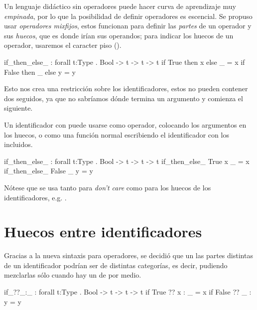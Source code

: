 {\begin{designfr}
Un lenguaje didáctico sin operadores puede hacer curva de aprendizaje muy \emph{empinada}, por lo que la posibilidad de definir operadores es escencial. Se propuso usar \emph{operadores mixfijos}, estos funcionan para definir las \emph{partes} de un operador y sus \emph{huecos}, que es donde irían sus operandos; para indicar los huecos de un operador, usaremos el caracter piso (\inlinecode{\_}).

\begin{anglercode}
if_then_else_ : forall t:Type . Bool -> t -> t -> t
if True  then x else _ = x
if False then _ else y = y
\end{anglercode}

Esto nos crea una restricción sobre los identificadores, estos no pueden contener dos \inlinecode{\_} seguidos, ya que no sabríamos dónde termina un argumento y comienza el siguiente.

Un identificador con \inlinecode{\_} puede usarse como operador, colocando los argumentos en los huecos, o como una función normal escribiendo el identificador con los \inlinecode{\_} incluidos.

\begin{anglercode}
if_then_else_ : forall t:Type . Bool -> t -> t -> t
if_then_else_ True  x _ = x
if_then_else_ False _ y = y
\end{anglercode}

Nótese que se usa \inlinecode{\_} tanto para \emph{don't care} como para los huecos de los identificadores, e.g. .
\end{designfr}

\section{Huecos entre identificadores}

\begin{designfr}
Gracias a la nueva sintaxis para operadores, se decidió que un las partes distintas de un identificador podrían ser de distintas categorías, es decir, pudiendo mezclarlas sólo cuando hay un \inlinecode{\_} de por medio.

\begin{anglercode}
if_??_:_ : forall t:Type . Bool -> t -> t -> t
if True  ?? x : _ = x
if False ?? _ : y = y
\end{anglercode}
\end{designfr}

}

